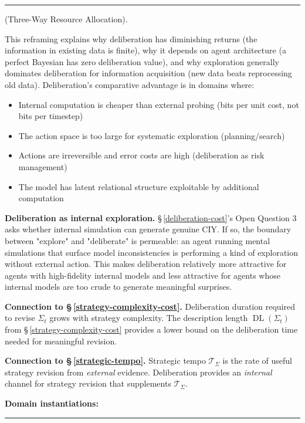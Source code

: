 \documentclass[11pt,oneside]{article}
\newcounter{claim}[section]
\renewcommand{\theclaim}{\thesection.\arabic{claim}}
\newenvironment{segment}[2]{%
  \refstepcounter{claim}%
  \bigskip\noindent\hrule\smallskip
  \noindent{\bfseries #1~\theclaim}\enskip(#2).\par\smallskip
  \noindent\ignorespaces
}{%
  \par\smallskip\noindent\hrule\bigskip
}
\newenvironment{discussion}[1][]{\begin{segment}{Discussion}{#1}}{\end{segment}}
\begin{document}
\begin{discussion}[Three-Way Resource Allocation]
This reframing explains why deliberation has diminishing returns (the information in existing data is finite), why it depends on agent architecture (a perfect Bayesian has zero deliberation value), and why exploration generally dominates deliberation for information acquisition (new data beats reprocessing old data). Deliberation's comparative advantage is in domains where:
\begin{itemize}
  \item Internal computation is cheaper than external probing (bits per unit cost, not bits per timestep)
  \item The action space is too large for systematic exploration (planning/search)
  \item Actions are irreversible and error costs are high (deliberation as risk management)
  \item The model has latent relational structure exploitable by additional computation
\end{itemize}


\textbf{Deliberation as internal exploration.} \S\,\ref{deliberation-cost}'s Open Question 3 asks whether internal simulation can generate genuine CIY. If so, the boundary between "explore" and "deliberate" is permeable: an agent running mental simulations that surface model inconsistencies is performing a kind of exploration without external action. This makes deliberation relatively more attractive for agents with high-fidelity internal models and less attractive for agents whose internal models are too crude to generate meaningful surprises.

\textbf{Connection to \S\,\ref{strategy-complexity-cost}.} Deliberation duration required to revise $\Sigma_t$ grows with strategy complexity. The description length $\operatorname{DL}(\Sigma_t)$ from \S\,\ref{strategy-complexity-cost} provides a lower bound on the deliberation time needed for meaningful revision.

\textbf{Connection to \S\,\ref{strategic-tempo}.} Strategic tempo $\mathcal{T}_\Sigma$ is the rate of useful strategy revision from \textit{external} evidence. Deliberation provides an \textit{internal} channel for strategy revision that supplements $\mathcal{T}_\Sigma$.

\textbf{Domain instantiations:}


\end{discussion}
\end{document}

